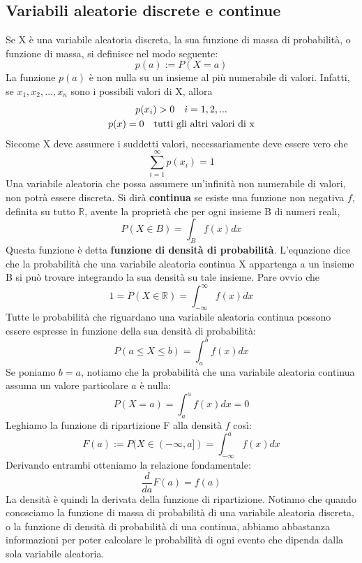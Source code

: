 \documentclass[11pt]{article}
\begin{document}
\subsection{Variabili aleatorie discrete e continue}
Se X è una variabile aleatoria discreta, la sua funzione di massa di probabilità, o funzione di massa, si definisce nel modo seguente:
\begin{displaymath}
    p(a) :=P(X=a)
\end{displaymath}
La funzione $p(a)$ è non nulla su un insieme al più numerabile di valori. Infatti, se $x_1,x_2,...,x_n$ sono i possibili valori di X, allora
\begin{gather*}
    p(x_i) > 0 \hspace{10px}i=1,2,...\\
    p(x) = 0 \hspace{10px}\mbox{tutti gli altri valori di x}
\end{gather*}
Siccome X deve assumere i suddetti valori, necessariamente deve essere vero che
\begin{displaymath}
    \sum_{i=1}^\infty p(x_i) = 1
\end{displaymath}
Una variabile aleatoria che possa assumere un'infinità non numerabile di valori, non potrà essere discreta. Si dirà \textbf{continua} se esiste una funzione non negativa $f$, definita su tutto $\mathbb{R}$, avente la proprietà che per ogni insieme B di numeri reali,
\begin{displaymath}
    P(X\in B) = \int_B f(x) dx
\end{displaymath}
Questa funzione è detta \textbf{funzione di densità di probabilità}. L'equazione dice che la probabilità che una variabile aleatoria continua X appartenga a un insieme B si può trovare integrando la sua densità su tale insieme. Pare ovvio che
\begin{displaymath}
    1=P(X\in \mathbb{R}) = \int_{-\infty}^{\infty} f(x)dx
\end{displaymath}
Tutte le probabilità che riguardano una variabile aleatoria continua possono essere espresse in funzione della sua densità di probabilità:
\begin{displaymath}
    P(a\le X \le b) = \int_a^b f(x)dx
\end{displaymath}
Se poniamo $b=a$, notiamo che la probabilità che una variabile aleatoria continua assuma un valore particolare $a$ è nulla:
\begin{displaymath}
    P(X=a) = \int_a^a f(x)dx = 0
\end{displaymath}
Leghiamo la funzione di ripartizione F alla densità $f$ così:
\begin{displaymath}
    F(a) := P(X \in (-\infty,a]) = \int_{-\infty}^a f(x)dx
\end{displaymath}
Derivando entrambi otteniamo la relazione fondamentale:
\begin{displaymath}
    \frac{d}{da}F(a) = f(a)
\end{displaymath}
La densità è quindi la derivata della funzione di ripartizione. 
Notiamo che quando conosciamo la funzione di massa di probabilità di una variabile aleatoria discreta, o la funzione di densità di probabilità di una continua, abbiamo abbastanza informazioni per poter calcolare le probabilità di ogni evento che dipenda dalla sola variabile aleatoria. 
\end{document}
